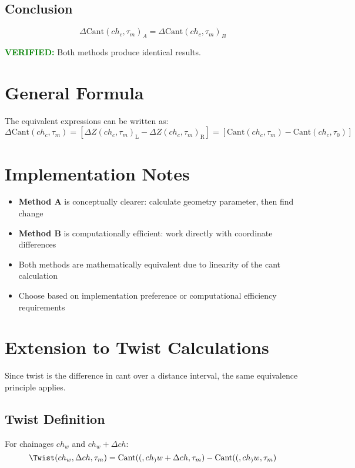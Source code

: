 \documentclass{article}
\newcommand{\chainage}[1]{ch_{#1}}
\newcommand{\time}[1]{\tau_{#1}}
\newcommand{\Left}{\text{L}}
\newcommand{\Right}{\text{R}}
\newcommand{\DZ}[3]{\Delta Z(#1, #2)_{#3}}
\newcommand{\Cant}[2]{\text{Cant}(#1, #2)}
\newcommand{\DCant}[2]{\Delta\text{Cant}(#1, #2)}
\begin{document}
\subsection{Conclusion}
\begin{equation}
\boxed{\DCant{\chainage{c}}{\time{m}}_A = \DCant{\chainage{c}}{\time{m}}_B}
\end{equation}

\textcolor{green}{\textbf{VERIFIED:}} Both methods produce identical results.

\section{General Formula}
The equivalent expressions can be written as:
\begin{equation}
\DCant{\chainage{c}}{\time{m}} = \left[\DZ{\chainage{c}}{\time{m}}{\Left} - \DZ{\chainage{c}}{\time{m}}{\Right}\right] = \left[\Cant{\chainage{c}}{\time{m}} - \Cant{\chainage{c}}{\time{0}}\right]
\end{equation}

\section{Implementation Notes}
\begin{itemize}
\item \textbf{Method A} is conceptually clearer: calculate geometry parameter, then find change
\item \textbf{Method B} is computationally efficient: work directly with coordinate differences
\item Both methods are mathematically equivalent due to linearity of the cant calculation
\item Choose based on implementation preference or computational efficiency requirements
\end{itemize}

\section{Extension to Twist Calculations}
Since twist is the difference in cant over a distance interval, the same equivalence principle applies.

\subsection{Twist Definition}
For chainages $\chainage{w}$ and $\chainage{w} + \Delta ch$:
\begin{equation}
\Twist(\chainage{w}, \Delta ch, \time{m}) = \Cant(\chainage{w} + \Delta ch, \time{m}) - \Cant(\chainage{w}, \time{m})
\end{equation}
\end{document}
